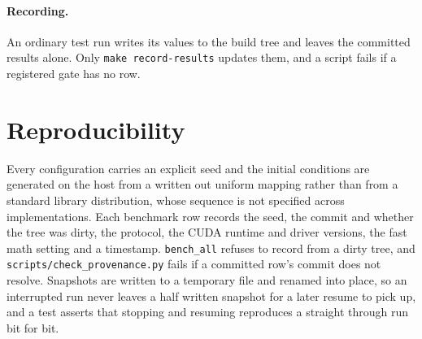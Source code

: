 \paragraph{Recording.} An ordinary test run writes its values to the build tree and leaves
the committed results alone. Only \texttt{make record-results} updates them, and a script
fails if a registered gate has no row.

\section{Reproducibility}

Every configuration carries an explicit seed and the initial conditions are
generated on the host from a written out uniform mapping rather than from a
standard library distribution, whose sequence is not specified across
implementations. Each benchmark row records the seed, the commit and whether the tree
was dirty, the protocol, the CUDA runtime and driver versions, the fast math setting and a
timestamp. \texttt{bench\_all} refuses to record from a dirty tree, and
\texttt{scripts/check\_provenance.py} fails if a committed row's commit does not resolve.
Snapshots
are written to a temporary file and renamed into place, so an interrupted run
never leaves a half written snapshot for a later resume to pick up, and a test
asserts that stopping and resuming reproduces a straight through run bit for
bit.
